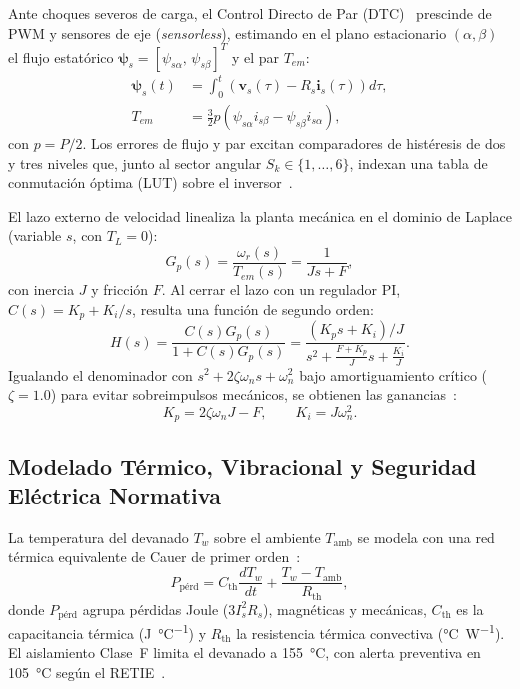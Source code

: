 Ante choques severos de carga, el Control Directo de Par (DTC)~\cite{Takahashi1986,Depenbrock1988,Vas1998} prescinde de PWM y sensores de eje (\emph{sensorless}), estimando en el plano estacionario $(\alpha,\beta)$ el flujo estatórico $\boldsymbol{\psi}_s = [\psi_{s\alpha},\,\psi_{s\beta}]^T$ y el par $T_{em}$:
\begin{equation}
\begin{aligned}
\boldsymbol{\psi}_s(t) &= \int_{0}^{t}\!\left(\mathbf{v}_s(\tau) - R_s \mathbf{i}_s(\tau)\right) d\tau, \\
T_{em} &= \frac{3}{2} p \left(\psi_{s\alpha} i_{s\beta} - \psi_{s\beta} i_{s\alpha}\right),
\end{aligned}
\label{eq:dtc_estimador}
\end{equation}
con $p = P/2$. Los errores de flujo y par excitan comparadores de histéresis de dos y tres niveles que, junto al sector angular $S_k \in \{1,\dots,6\}$, indexan una tabla de conmutación óptima (LUT) sobre el inversor~\cite{Takahashi1986,Vas1998}.

El lazo externo de velocidad linealiza la planta mecánica en el dominio de Laplace (variable $s$, con $T_L = 0$):
\begin{equation}
G_p(s) = \frac{\omega_r(s)}{T_{em}(s)} = \frac{1}{J s + F},
\label{eq:planta_mecanica}
\end{equation}
con inercia $J$ y fricción $F$. Al cerrar el lazo con un regulador PI, $C(s) = K_p + K_i/s$, resulta una función de segundo orden:
\begin{equation}
H(s) = \frac{C(s)G_p(s)}{1 + C(s)G_p(s)} = \frac{(K_p s + K_i)/J}{s^2 + \frac{F + K_p}{J}s + \frac{K_i}{J}}.
\label{eq:lazo_cerrado_pi}
\end{equation}
Igualando el denominador con $s^2 + 2\zeta\omega_n s + \omega_n^2$ bajo amortiguamiento crítico ($\zeta = \num{1.0}$) para evitar sobreimpulsos mecánicos, se obtienen las ganancias~\cite{Krishnan2001}:
\begin{equation}
K_p = 2\zeta\omega_n J - F, \qquad K_i = J\omega_n^2.
\label{eq:ganancias_pi}
\end{equation}

\subsection{Modelado Térmico, Vibracional y Seguridad Eléctrica Normativa}\label{subsec:termico_seguridad}

La temperatura del devanado $T_w$ sobre el ambiente $T_{\text{amb}}$ se modela con una red térmica equivalente de Cauer de primer orden~\cite{Nandi2005,Thermal2025}:
\begin{equation}
P_{\text{pérd}} = C_{\text{th}}\frac{dT_w}{dt} + \frac{T_w - T_{\text{amb}}}{R_{\text{th}}},
\label{eq:red_cauer}
\end{equation}
donde $P_{\text{pérd}}$ agrupa pérdidas Joule ($3I_s^2 R_s$), magnéticas y mecánicas, $C_{\text{th}}$ es la capacitancia térmica (\unit{\joule\per\celsius}) y $R_{\text{th}}$ la resistencia térmica convectiva (\unit{\celsius\per\watt}). El aislamiento Clase~F limita el devanado a \qty{155}{\celsius}, con alerta preventiva en \qty{105}{\celsius} según el RETIE~\cite{RETIE2024,RETIE2026}.

